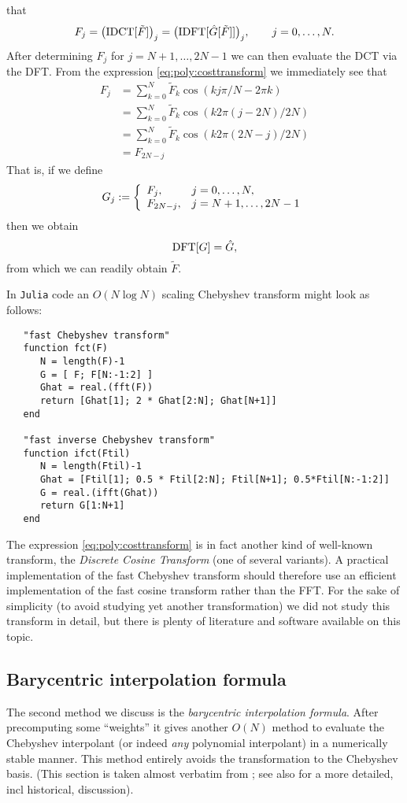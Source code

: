 that 
\[
   F_j = \big({\rm IDCT}[\tilde{F}]\big)_j = 
   \big( {\rm IDFT}[\hat{G}[\tilde{F}]] \big)_j, \qquad j = 0, \dots, N.
\]
After determining $F_j$ for $j = N+1, \dots, 2N-1$ we can then evaluate the 
DCT via the DFT.  From the expression \eqref{eq:poly:costtransform} we 
immediately see that 
\begin{align*}
   F_{j}
   &= 
   \sum_{k = 0}^N \tilde{F}_k \cos(kj\pi/N - 2\pi k) 
   \\ &= 
   \sum_{k = 0}^N \tilde{F}_k \cos(k2\pi(j-2N)/2N) 
   \\ &= 
   \sum_{k = 0}^N \tilde{F}_k \cos(k2\pi(2N-j)/2N)
   \\ &= 
   F_{2N-j}
\end{align*}
That is, if we define 
\[
   G_j := \left\{ \begin{array}{ll} 
      F_j, & j = 0, \dots, N, \\ 
      F_{2N-j}, & j = N+1, \dots, 2N-1
    \end{array} \right.
\]
then we obtain 
\[
   {\rm DFT}[G] = \hat{G},   
\]
from which we can readily obtain $\tilde{F}$. 

In {\tt Julia} code an $O(N\log N)$ scaling Chebyshev transform might 
look as follows: 

\begin{verbatim}
   "fast Chebyshev transform"
   function fct(F)
      N = length(F)-1
      G = [ F; F[N:-1:2] ]
      Ghat = real.(fft(F))
      return [Ghat[1]; 2 * Ghat[2:N]; Ghat[N+1]]
   end 

   "fast inverse Chebyshev transform"
   function ifct(Ftil)
      N = length(Ftil)-1
      Ghat = [Ftil[1]; 0.5 * Ftil[2:N]; Ftil[N+1]; 0.5*Ftil[N:-1:2]]
      G = real.(ifft(Ghat))
      return G[1:N+1]
   end
\end{verbatim}


\begin{remark}
   The expression \eqref{eq:poly:costtransform} is in fact another kind of 
   well-known transform, the {\em Discrete Cosine Transform} (one of several 
   variants). A practical implementation of the fast Chebyshev transform 
   should therefore use an efficient implementation of the fast cosine transform 
   rather than the FFT.
   For the sake  of simplicity (to avoid studying yet another transformation) 
   we did not study this transform in detail, but there is plenty of literature 
   and software available on this topic. 
\end{remark}



\subsection{Barycentric interpolation formula}
%
\label{sec:poly:bary}
%
The second method we discuss is the {\em barycentric interpolation formula}.
After precomputing some ``weights'' it gives another $O(N)$ method to evaluate
the Chebyshev interpolant (or indeed {\em any} polynomial interpolant) in a
numerically stable manner. This method entirely avoids the transformation to the
Chebyshev basis. (This section is taken almost verbatim from
\cite{Trefethen2013-rg}; see also \cite[Ch. 5]{Trefethen2013-rg} for a more
detailed, incl historical, discussion).

